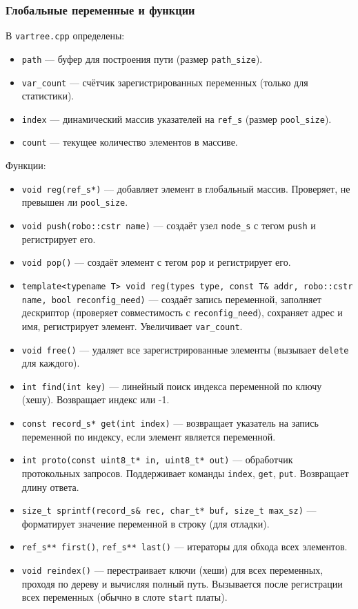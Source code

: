 \documentclass[a4paper,12pt]{article}
\begin{document}
\subsubsection{Глобальные переменные и функции}

В \texttt{vartree.cpp} определены:

\begin{itemize}
    \item \texttt{path} — буфер для построения пути (размер \texttt{path\_size}).
    \item \texttt{var\_count} — счётчик зарегистрированных переменных (только для статистики).
    \item \texttt{index} — динамический массив указателей на \texttt{ref\_s} (размер \texttt{pool\_size}).
    \item \texttt{count} — текущее количество элементов в массиве.
\end{itemize}

Функции:
\begin{itemize}
    \item \texttt{void reg(ref\_s*)} — добавляет элемент в глобальный массив. Проверяет, не превышен ли \texttt{pool\_size}.
    \item \texttt{void push(robo::cstr name)} — создаёт узел \texttt{node\_s} с тегом \texttt{push} и регистрирует его.
    \item \texttt{void pop()} — создаёт элемент с тегом \texttt{pop} и регистрирует его.
    \item \texttt{template<typename T> void reg(types type, const T\& addr, robo::cstr name, bool reconfig\_need)} — создаёт запись переменной, заполняет дескриптор (проверяет совместимость с \texttt{reconfig\_need}), сохраняет адрес и имя, регистрирует элемент. Увеличивает \texttt{var\_count}.
    \item \texttt{void free()} — удаляет все зарегистрированные элементы (вызывает \texttt{delete} для каждого).
    \item \texttt{int find(int key)} — линейный поиск индекса переменной по ключу (хешу). Возвращает индекс или -1.
    \item \texttt{const record\_s* get(int index)} — возвращает указатель на запись переменной по индексу, если элемент является переменной.
    \item \texttt{int proto(const uint8\_t* in, uint8\_t* out)} — обработчик протокольных запросов. Поддерживает команды \texttt{index}, \texttt{get}, \texttt{put}. Возвращает длину ответа.
    \item \texttt{size\_t sprintf(record\_s\& rec, char\_t* buf, size\_t max\_sz)} — форматирует значение переменной в строку (для отладки).
    \item \texttt{ref\_s** first()}, \texttt{ref\_s** last()} — итераторы для обхода всех элементов.
    \item \texttt{void reindex()} — перестраивает ключи (хеши) для всех переменных, проходя по дереву и вычисляя полный путь. Вызывается после регистрации всех переменных (обычно в слоте \texttt{start} платы).
\end{itemize}
\end{document}
